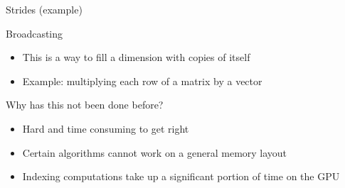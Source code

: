 \documentclass[utf8x,xcolor=pdftex,dvipsnames,table]{beamer}
\begin{document}
\begin{frame}{Strides (example)}
\begin{center}
\end{center}
\end{frame}

\begin{frame}{Broadcasting}
\begin{itemize}
\item This is a way to fill a dimension with copies of itself
\item Example: multiplying each row of a matrix by a vector
\end{itemize}
\end{frame}

\begin{frame}{Why has this not been done before?}
\begin{itemize}
\item Hard and time consuming to get right
\item Certain algorithms cannot work on a general memory layout
\item Indexing computations take up a significant portion of time on the GPU
\end{itemize}
\end{frame}
\end{document}
